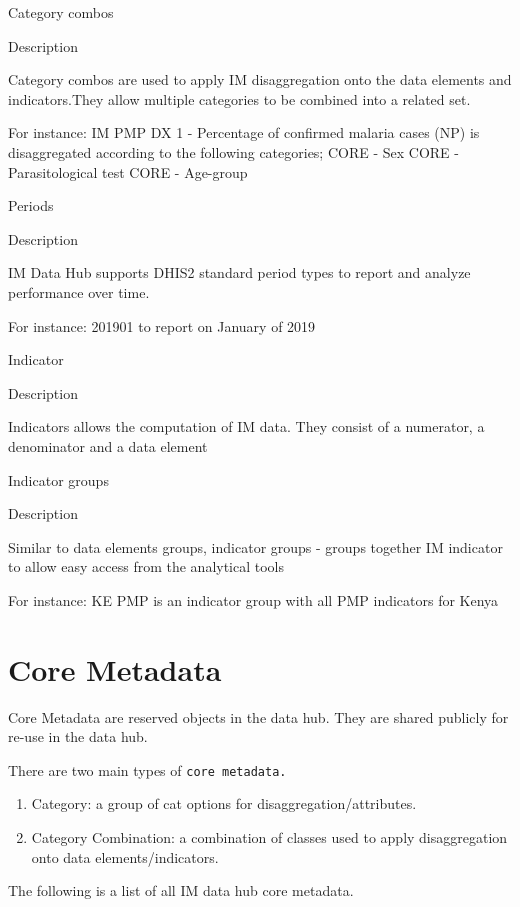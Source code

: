 \documentclass[]{book}
\providecommand{\tightlist}{%
  \setlength{\itemsep}{0pt}\setlength{\parskip}{0pt}}
\begin{document}
Category combos

Description

Category combos are used to apply IM disaggregation onto the data elements and indicators.They allow multiple categories to be combined into a related set.

For instance: IM PMP DX 1 - Percentage of confirmed malaria cases (NP) is disaggregated according to the following categories; CORE - Sex \textbar{} CORE - Parasitological test \textbar{} CORE - Age-group

Periods

Description

IM Data Hub supports DHIS2 standard period types to report and analyze performance over time.

For instance: 201901 to report on January of 2019

Indicator

Description

Indicators allows the computation of IM data. They consist of a numerator, a denominator and a data element

Indicator groups

Description

Similar to data elements groups, indicator groups - groups together IM indicator to allow easy access from the analytical tools

For instance: KE PMP is an indicator group with all PMP indicators for Kenya

\hypertarget{core-metadata}{%
\section{Core Metadata}\label{core-metadata}}

Core Metadata are reserved objects in the data hub. They are shared publicly for re-use in the data hub.

There are two main types of \texttt{core\ metadata.}

\begin{enumerate}
\def\labelenumi{\arabic{enumi}.}
\tightlist
\item
  Category: a group of cat options for disaggregation/attributes.
\item
  Category Combination: a combination of classes used to apply disaggregation onto data elements/indicators.
\end{enumerate}

The following is a list of all IM data hub core metadata.
\end{document}
